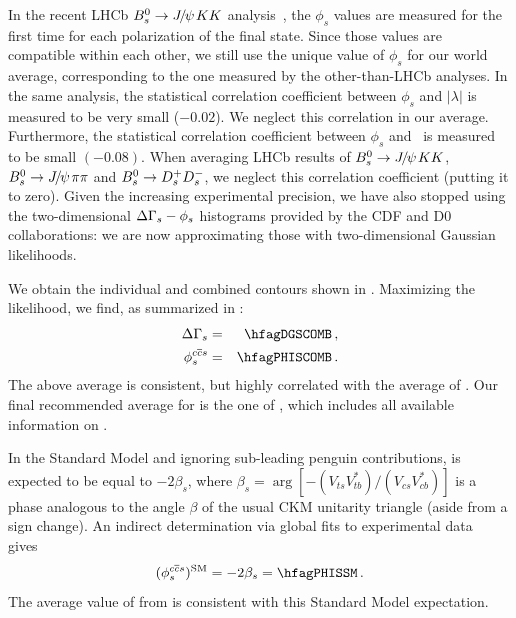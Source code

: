 In the recent LHCb $B^0_s \to {J\mskip -3mu/\mskip -2mu\psi\mskip 2mu} KK$ analysis~\cite{LHCB-PAPER-2014-059,*Aaij:2013oba_supersede2}, the $\phi_s$ values are measured for the first time for each polarization of the final state. Since those values are compatible within each other, we still use the unique value of $\phi_s$ for our world average, corresponding to the one measured by the other-than-LHCb analyses. 
In the same analysis, the statistical correlation coefficient between $\phi_s$ and $|\lambda|$ is measured to be very small ($-0.02$). We neglect this correlation in our average. 
Furthermore, the statistical correlation coefficient between $\phi_s$ and \DGs\ is measured to be small $(-0.08)$. When averaging LHCb results of 
$B^0_s \to {J\mskip -3mu/\mskip -2mu\psi\mskip 2mu} KK$,  $B^0_s \to {J\mskip -3mu/\mskip -2mu\psi\mskip 2mu} \pi\pi$ and $B^0_s \to D_s^+ D_s^-$, we neglect this correlation coefficient (putting it to zero). 
Given the increasing experimental precision, we have also stopped using the two-dimensional $\Delta\Gamma_{s}-\phi_s$ histograms provided by the CDF and D0 collaborations: we are now approximating those with two-dimensional Gaussian likelihoods. 

We obtain the individual and combined contours shown in . %
Maximizing the likelihood, we find, as summarized in :  
\begin{eqnarray}
\DGs &=& \hfagDGSCOMB \,, \\    
\phiccbars &=& \hfagPHISCOMB \,.
\labe{phis}
\end{eqnarray}
The above \DGs average is consistent, but highly correlated with the average
of . Our
final recommended average for \DGs is the one of , which 
includes all available information on \DGs. 

In the Standard Model and ignoring sub-leading penguin contributions, 
\phiccbars is expected to be equal to $-2\beta_s$, 
where
$\beta_s = \arg\left[-\left(V_{ts}V^*_{tb}\right)/\left(V_{cs}V^*_{cb}\right)\right]$ %
is a phase analogous to the angle $\beta$ of the usual CKM
unitarity triangle (aside from a sign change). %
An indirect determination via global fits to experimental data
gives~\cite{Charles:2011va_mod}
\begin{equation}
(\phiccbars)^{\rm SM} = -2\beta_s = \hfagPHISSM \,.
\labe{phisSM}
\end{equation}
The average value of \phiccbars from  is consistent with this
Standard Model expectation.

